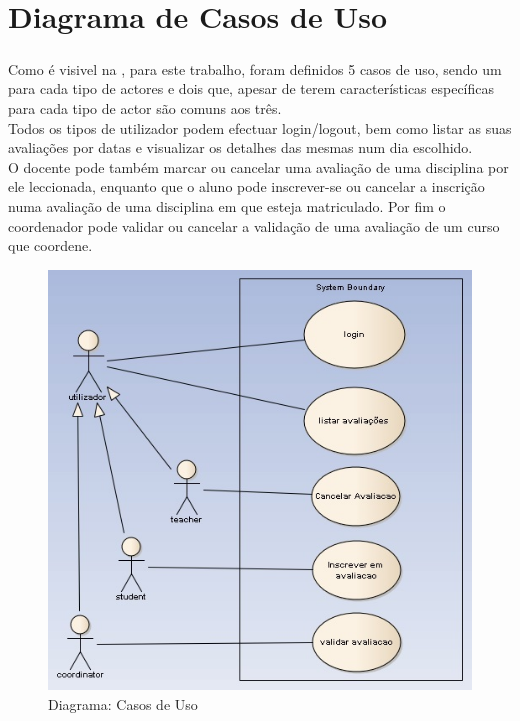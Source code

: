\chapter{Diagrama de Casos de Uso}

\paragraph{}

Como é visivel na , para este trabalho, foram definidos 5 casos de uso, sendo um para cada tipo de actores e dois que, apesar de terem características específicas para cada tipo de actor são comuns aos três.\\
Todos os tipos de utilizador podem efectuar login/logout, bem como listar as suas avaliações por datas e visualizar os detalhes das mesmas num dia escolhido.\\
O docente pode também marcar ou cancelar uma avaliação de uma disciplina por ele leccionada, enquanto que o aluno pode inscrever-se ou cancelar a inscrição numa avaliação de uma disciplina em que esteja matriculado. Por fim o coordenador pode validar ou cancelar a validação de uma avaliação de um curso que coordene.

\begin{figure}[!htbp]
\centering
\includegraphics{imagens/casos_de_uso.jpg}
\caption{Diagrama: Casos de Uso}
\label{fig:casos_de_uso}
\end{figure}